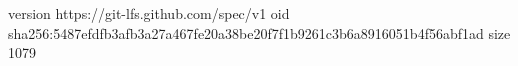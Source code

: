 version https://git-lfs.github.com/spec/v1
oid sha256:5487efdfb3afb3a27a467fe20a38be20f7f1b9261c3b6a8916051b4f56abf1ad
size 1079
